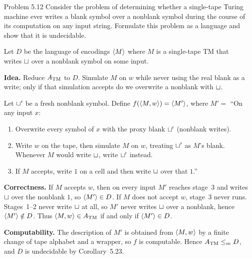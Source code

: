 \begin{question}{Problem 5.12}
Consider the problem of determining whether a single-tape Turing machine ever writes a blank symbol over a nonblank symbol during the course of its computation on any input string. Formulate this problem as a language and show that it is undecidable.
\end{question}
\begin{soln}
Let $D$ be the language of encodings $\langle M\rangle$ where $M$ is a single-tape TM that writes $\sqcup$ over a nonblank symbol on some input.

\textbf{Idea.} Reduce $A_{\mathrm{TM}}$ to $D$. Simulate $M$ on $w$ while never using the real blank as a write; only if that simulation accepts do we overwrite a nonblank with $\sqcup$.

Let $\sqcup'$ be a fresh nonblank symbol. Define $f(\langle M,w\rangle)=\langle M'\rangle$, where
$M'=$ ``On any input $x$:
\begin{enumerate}
\item Overwrite every symbol of $x$ with the proxy blank $\sqcup'$ (nonblank writes).
\item Write $w$ on the tape, then simulate $M$ on $w$, treating $\sqcup'$ as $M$'s blank. Whenever $M$ would write $\sqcup$, write $\sqcup'$ instead.
\item If $M$ accepts, write $1$ on a cell and then write $\sqcup$ over that $1$.''
\end{enumerate}

\textbf{Correctness.}
If $M$ accepts $w$, then on every input $M'$ reaches stage~3 and writes $\sqcup$ over the nonblank $1$, so $\langle M'\rangle\in D$.
If $M$ does not accept $w$, stage~3 never runs. Stages~1--2 never write $\sqcup$ at all, so $M'$ never writes $\sqcup$ over a nonblank, hence $\langle M'\rangle\notin D$.
Thus $\langle M,w\rangle\in A_{\mathrm{TM}}$ if and only if $\langle M'\rangle\in D$.

\textbf{Computability.} The description of $M'$ is obtained from $\langle M,w\rangle$ by a finite change of tape alphabet and a wrapper, so $f$ is computable. Hence $A_{\mathrm{TM}}\le_{m} D$, and $D$ is undecidable by Corollary~5.23.
\end{soln}
